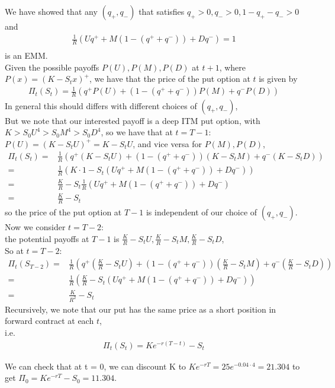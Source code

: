 \begin{example}
We have showed that any $ (q_+, q_-) $ that satisfies $ q_+ > 0, q_- > 0, 1 - q_+ - q_- > 0 $ and
\begin{align*}
    \frac{1}{R} \left( U q^+ + M (1 - (q^+ + q^-)) + D q^- \right) = 1 \\
\end{align*}
is an EMM.\\ 
Given the possible payoffs $ P(U), P(M), P(D) $ at $ t+1 $, where $ P(x) = (K - S_t x)^+ $, 
we have that the price of the put option at $ t $ is given by
\begin{align*}
    {\Pi}_t(S_t) = \frac{1}{R} \left( q^+ P(U) + (1 - (q^+ + q^-)) P(M) + q^- P(D) \right)
\end{align*}
In general this should differs with different choices of $ (q_+, q_-) $, \\
But we note that our interested payoff is a deep ITM put option, with $ K > S_0 U^4 > S_0 M^4 > S_0 D^4$, 
so we have that at $ t = T-1$: $ P(U) = (K - S_t U)^+ = K - S_t U $, and vice versa for $ P(M), P(D) $,
\begin{align*}
    {\Pi}_t(S_t) =& \frac{1}{R} \left( q^+ (K - S_t U) + (1 - (q^+ + q^-)) (K - S_t M) + q^- (K - S_t D) \right) \\
    =& \frac{1}{R} \left( K \cdot 1 - S_t (U q^+ + M (1 - (q^+ + q^-)) + D q^-) \right) \\
    =& \frac{K}{R} - S_t \frac{1}{R} \left( U q^+ + M (1 - (q^+ + q^-)) + D q^- \right) \\
    =& \frac{K}{R} - S_t
\end{align*}
so the price of the put option at $T-1$ is independent of our choice of $ (q_+, q_-) $.\\
Now we consider $ t = T-2$: \\
the potential payoffs at $T-1$ is $ \frac{K}{R} - S_t U, \frac{K}{R} - S_t M, \frac{K}{R} - S_t D $, \\
So at $ t = T-2 $:
\begin{align*}
    {\Pi}_t(S_{T-2}) =& \frac{1}{R} \left( q^+ \left( \frac{K}{R} - S_t U \right) + (1 - (q^+ + q^-)) \left( \frac{K}{R} - S_t M \right) + q^- \left( \frac{K}{R} - S_t D \right) \right) \\
    =& \frac{1}{R} \left( \frac{K}{R} - S_t (U q^+ + M (1 - (q^+ + q^-)) + D q^-) \right) \\
    =& \frac{K}{R^2} - S_t
\end{align*}
Recursively, we note that our put has the same price as a short position in forward contract at each $t$, \\
i.e.
\begin{align*}
    {\Pi}_t(S_t) = K e^{-r(T-t)} - S_t
\end{align*}

We can check that at t = 0, we can discount K to
$ K e^{-rT} = 25 e^{-0.04 \cdot 4} = 21.304 $ to get $ {\Pi}_0 = K e^{-rT} - S_0 = 11.304 $.
\end{example}


